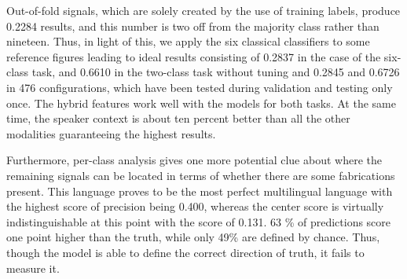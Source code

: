 Out-of-fold signals, which are solely created by the use of training labels, produce 0.2284 results, and this number is two off from the majority class rather than nineteen. Thus, in light of this, we apply the six classical classifiers to some reference figures leading to ideal results consisting of 0.2837 in the case of the six-class task, and 0.6610 in the two-class task without tuning and 0.2845 and 0.6726 in 476 configurations, which have been tested during validation and testing only once. The hybrid features work well with the models for both tasks. At the same time, the speaker context is about ten percent better than all the other modalities guaranteeing the highest results.

Furthermore, per-class analysis gives one more potential clue about where the remaining signals can be located in terms of whether there are some fabrications present. This language proves to be the most perfect multilingual language with the highest score of precision being 0.400, whereas the center score is virtually indistinguishable at this point with the score of 0.131. 63 \% of predictions score one point higher than the truth, while only 49\% are defined by chance. Thus, though the model is able to define the correct direction of truth, it fails to measure it.
